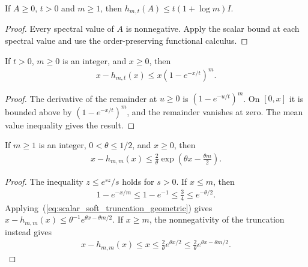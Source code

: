 \begin{lemma}
    \label{lem:soft_truncation_operator_cap}
    \leanok
    If $A\ge0$, $t>0$ and $m\ge1$, then
    $h_{m,t}(A)\le t(1+\log m)I$.
\end{lemma}
\begin{proof}\leanok
    Every spectral value of $A$ is nonnegative. Apply the scalar bound
    at each spectral value and use the order-preserving functional calculus.
\end{proof}

\begin{lemma}
    \label{lem:scalar_soft_truncation_geometric}
    \leanok
    If $t>0$, $m\geq0$ is an integer, and $x\geq0$, then
    \begin{align}
        x-h_{m,t}(x)\leq x(1-e^{-x/t})^m.
        \label{eq:scalar_soft_truncation_geometric}
    \end{align}
\end{lemma}
\begin{proof}\leanok
    The derivative of the remainder at $u\geq0$ is $(1-e^{-u/t})^m$.
    On $[0,x]$ it is bounded above by $(1-e^{-x/t})^m$, and the
    remainder vanishes at zero. The mean value inequality gives the result.
\end{proof}

\begin{lemma}
    \label{thm:scalar_soft_truncation_exp_weight}
    \leanok
    If $m\geq1$ is an integer, $0<\theta\leq1/2$, and $x\geq0$, then
    \begin{align}
        x-h_{m,m}(x)
        \leq\frac2\theta\exp\!\left(\theta x-\frac{\theta m}{2}\right).
        \label{eq:scalar_soft_truncation_exp_weight}
    \end{align}
\end{lemma}
\begin{proof}\leanok
    The inequality $z\leq e^{sz}/s$ holds for $s>0$. If $x\leq m$,
    then
    \begin{align}
        1-e^{-x/m}\leq1-e^{-1}\leq\frac34\leq e^{-\theta/2}.
    \end{align}
    Applying~(\ref{eq:scalar_soft_truncation_geometric}) gives
    $x-h_{m,m}(x)\leq\theta^{-1}e^{\theta x-\theta m/2}$.
    If $x\geq m$, the nonnegativity of the truncation instead gives
    \begin{align}
        x-h_{m,m}(x)\leq x
        \leq\frac2\theta e^{\theta x/2}
        \leq\frac2\theta e^{\theta x-\theta m/2}.
    \end{align}
\end{proof}

